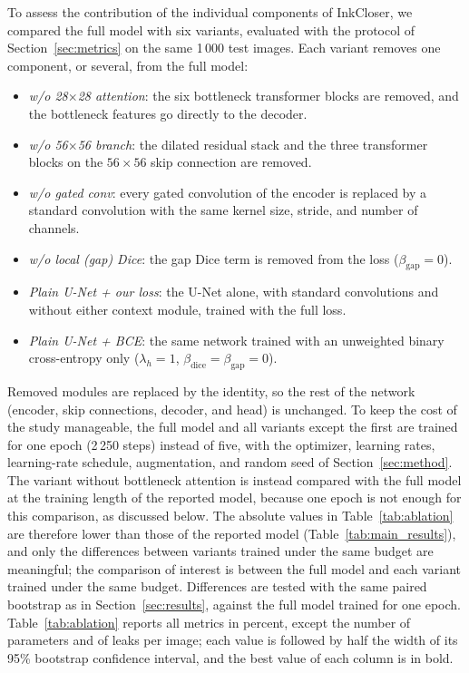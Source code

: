 \documentclass[11pt]{article}
\begin{document}
To assess the contribution of the individual components of InkCloser, we compared
the full model with six variants, evaluated with the protocol of
Section~\ref{sec:metrics} on the same 1\,000 test images. Each variant removes one
component, or several, from the full model:
\begin{itemize}
\item \emph{w/o 28$\times$28 attention}: the six bottleneck transformer blocks are
  removed, and the bottleneck features go directly to the decoder.
\item \emph{w/o 56$\times$56 branch}: the dilated residual stack and the three
  transformer blocks on the $56\times 56$ skip connection are removed.
\item \emph{w/o gated conv}: every gated convolution of the encoder is replaced by a
  standard convolution with the same kernel size, stride, and number of channels.
\item \emph{w/o local (gap) Dice}: the gap Dice term is removed from the loss
  ($\beta_{\mathrm{gap}} = 0$).
\item \emph{Plain U-Net + our loss}: the U-Net alone, with standard convolutions and
  without either context module, trained with the full loss.
\item \emph{Plain U-Net + BCE}: the same network trained with an unweighted binary
  cross-entropy only ($\lambda_h = 1$, $\beta_{\mathrm{dice}} = \beta_{\mathrm{gap}} = 0$).
\end{itemize}
Removed modules are replaced by the identity, so the rest of the network (encoder,
skip connections, decoder, and head) is unchanged. To keep the cost of the study
manageable, the full model and all variants except the first are trained for one
epoch (2\,250 steps) instead of five, with the optimizer, learning rates,
learning-rate schedule, augmentation, and random seed of Section~\ref{sec:method}.
The variant without bottleneck attention is instead compared with the full model at
the training length of the reported model, because one epoch is not enough for this
comparison, as discussed below. The absolute
values in Table~\ref{tab:ablation} are therefore lower than those of the reported
model (Table~\ref{tab:main_results}), and only the differences between variants
trained under the same budget are meaningful; the comparison of interest is
between the full model and each variant trained under the same budget. Differences
are tested with the same paired bootstrap as in Section~\ref{sec:results}, against
the full model trained for one epoch. Table~\ref{tab:ablation} reports all metrics
in percent, except the number of parameters and of leaks per image; each value is
followed by half the width of its 95\% bootstrap confidence interval, and the best
value of each column is in bold.
\end{document}
